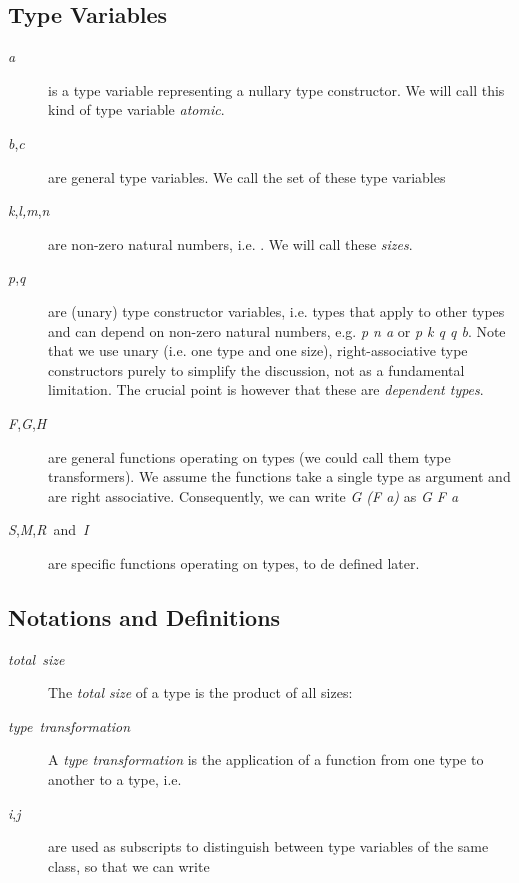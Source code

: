 \documentclass{article}
\begin{document}
\subsection{Type Variables}
\begin{description}
\item [{\emph{a}}] is a type variable representing a nullary type constructor.
We will call this kind of type variable \emph{atomic}.
\item [{\emph{b},\emph{c}}] are general type variables. We call the set
of these type variables 
\item [{\emph{k},\emph{l,m},\emph{n}}] are non-zero natural numbers, i.e.
. We will call these \emph{sizes}.
\item [{\emph{p},\emph{q}}] are (unary) type constructor variables, i.e.
types that apply to other types and can depend on non-zero natural
numbers, e.g. \emph{p n a} or \emph{p k q q b}. Note that we use unary
(i.e. one type and one size), right-associative type constructors
purely to simplify the discussion, not as a fundamental limitation.
The crucial point is however that these are \emph{dependent types}. 
\item [{\emph{F},\emph{G},\emph{H}}] are general functions operating on
types (we could call them type transformers). We assume the functions
take a single type as argument and are right associative. Consequently,
we can write \emph{G (F a)} as \emph{G F a}
\item [{\emph{S},\emph{M},\emph{R}~and~\emph{I}}] are specific functions
operating on types, to de defined later.
\end{description}

\subsection{Notations and Definitions}
\begin{description}
\item [{\emph{total~size}}] The \emph{total size} of a type is the product
of all sizes:
\end{description}

\begin{description}
\item [{\emph{type~transformation}}] A \emph{type transformation} is the
application of a function from one type to another to a type, i.e.

\item [{\emph{i},\emph{j}}] are used as subscripts to distinguish between
type variables of the same class, so that we can write 
\end{description}
\end{document}

